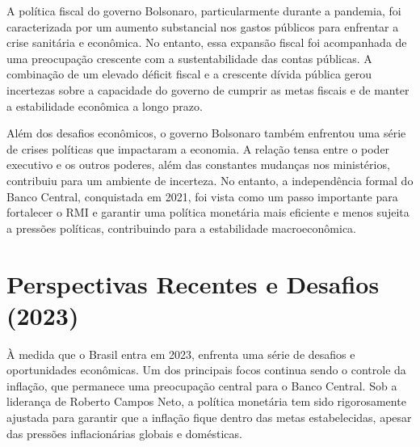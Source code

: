 \documentclass[12pt,oneside,a4paper,chapter=TITLE,english,brazil,sumario=abnt-6027-2012]{abntex2}
\begin{document}
A política fiscal do governo Bolsonaro, particularmente durante a pandemia, foi caracterizada por um aumento substancial nos gastos públicos para enfrentar a crise sanitária e econômica. No entanto, essa expansão fiscal foi acompanhada de uma preocupação crescente com a sustentabilidade das contas públicas. A combinação de um elevado déficit fiscal e a crescente dívida pública gerou incertezas sobre a capacidade do governo de cumprir as metas fiscais e de manter a estabilidade econômica a longo prazo.

Além dos desafios econômicos, o governo Bolsonaro também enfrentou uma série de crises políticas que impactaram a economia. A relação tensa entre o poder executivo e os outros poderes, além das constantes mudanças nos ministérios, contribuiu para um ambiente de incerteza. No entanto, a independência formal do Banco Central, conquistada em 2021, foi vista como um passo importante para fortalecer o RMI e garantir uma política monetária mais eficiente e menos sujeita a pressões políticas, contribuindo para a estabilidade macroeconômica.

\section{Perspectivas Recentes e Desafios (2023)}

À medida que o Brasil entra em 2023, enfrenta uma série de desafios e oportunidades econômicas. Um dos principais focos continua sendo o controle da inflação, que permanece uma preocupação central para o Banco Central. Sob a liderança de Roberto Campos Neto, a política monetária tem sido rigorosamente ajustada para garantir que a inflação fique dentro das metas estabelecidas, apesar das pressões inflacionárias globais e domésticas.



\end{document}
